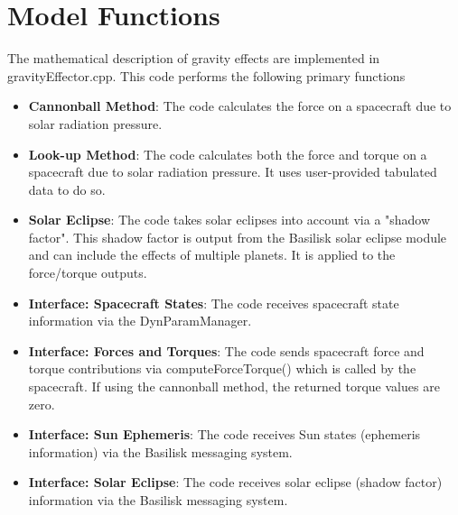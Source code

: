 \section{Model Functions}
The mathematical description of gravity effects are implemented in gravityEffector.cpp. This code performs the following primary functions
\begin{itemize}
	\item \textbf{Cannonball Method}: The code calculates the force on a spacecraft due to solar radiation pressure.
	\item \textbf{Look-up Method}: The code calculates both the force and torque on a spacecraft due to solar radiation pressure. It uses user-provided tabulated data to do so.
	\item \textbf{Solar Eclipse}: The code takes solar eclipses into account via a "shadow factor". This shadow factor is output from the Basilisk solar eclipse module and can include the effects of multiple planets. It is applied to the force/torque outputs.
	\item \textbf{Interface: Spacecraft States}: The code receives spacecraft state information via the DynParamManager.
	\item \textbf{Interface: Forces and Torques}: The code sends spacecraft force and torque contributions via computeForceTorque() which is called by the spacecraft.	If using the cannonball method, the returned torque values are zero.
	\item \textbf{Interface: Sun Ephemeris}: The code receives Sun states (ephemeris information) via the Basilisk messaging system.
	\item \textbf{Interface: Solar Eclipse}: The code receives solar eclipse (shadow factor) information via the Basilisk messaging system.
	
\end{itemize}



